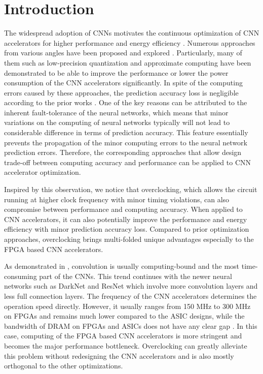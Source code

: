 \section{Introduction} \label{sec:intro}
The widespread adoption of CNNs motivates the 
continuous optimization of CNN accelerators for higher 
performance and energy efficiency
\cite{pipecnn_2,Zhang2015_9,Qiu2016_10,Farabet2010_13,Zeng2018_18}. 
Numerous approaches from various 
angles have been proposed and explored \cite{EIE_han_2016,deepburing_12}. 
Particularly, many of them such as 
low-precision quantization \cite{Hwang2014_17,Matthieu2014_8} 
and approximate computing \cite{Approximate_Multiplier_31,Approximate_32,approximate_33}
have been demonstrated to 
be able to improve the performance or lower the power consumption of the CNN 
accelerators significantly. In spite of the computing errors caused by these approaches, 
the prediction accuracy loss is negligible according to the prior works \cite{deep_compress_han_2015}.
One of the key reasons can be attributed to the inherent fault-tolerance of 
the neural networks, which means that minor variations on the 
computing of neural networks typically will not lead to considerable 
difference in terms of prediction accuracy. This 
feature essentially prevents the propagation of 
the minor computing errors to the neural network prediction errors. 
Therefore, the corresponding approaches that allow design trade-off 
between computing accuracy and performance can be applied to CNN 
accelerator optimization.

Inspired by this observation, we notice that overclocking, which 
allows the circuit running at higher clock frequency with minor 
timing violations, can also compromise between performance 
and computing accuracy. When applied to CNN accelerators, 
it can also potentially improve the performance and energy 
efficiency with minor prediction accuracy loss.
Compared to prior optimization approaches, overclocking brings 
multi-folded unique advantages especially to the FPGA based CNN 
accelerators. 

As demonstrated in \cite{Caffeine_6,EIE_han_2016}, convolution is usually 
computing-bound and the most time-consuming part of the CNNs. 
This trend continues with the newer neural networks 
such as DarkNet and ResNet which involve more convolution layers 
and less full connection layers. The frequency of the CNN 
accelerators determines the operation speed directly. However, 
it usually ranges from 150 MHz to 300 MHz on FPGAs and 
remains much lower compared to the ASIC designs, while the 
bandwidth of DRAM on FPGAs and ASICs does not have any 
clear gap \cite{asic_fpga}. In this case, computing of the FPGA based CNN 
accelerators is more stringent and becomes the major 
performance bottleneck. Overclocking can greatly alleviate this 
problem without redesigning the CNN accelerators and is 
also mostly orthogonal to the other optimizations. 

